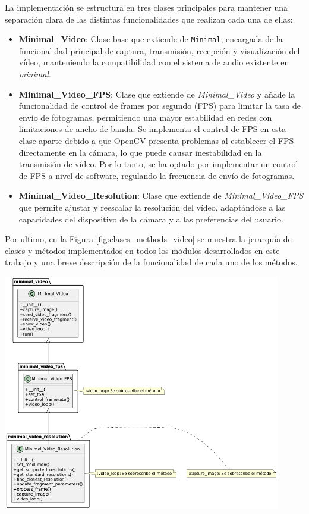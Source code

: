 La implementación se estructura en tres clases principales para mantener una separación clara de las distintas funcionalidades que realizan cada una de ellas:

\begin{itemize}
    \item \textbf{Minimal\_Video}: Clase base que extiende de \texttt{Minimal}, encargada de la funcionalidad principal de captura, transmisión, recepción y visualización del vídeo, manteniendo la compatibilidad con el sistema de audio existente en \textit{minimal}.
    \item \textbf{Minimal\_Video\_FPS}: Clase que extiende de \textit{Minimal\_Video} y añade la funcionalidad de control de frames por segundo (FPS) para limitar la tasa de envío de fotogramas, permitiendo una mayor estabilidad en redes con limitaciones de ancho de banda. Se implementa el control de FPS en esta clase aparte debido a que OpenCV presenta problemas al establecer el FPS directamente en la cámara, lo que puede causar inestabilidad en la transmisión de vídeo. Por lo tanto, se ha optado por implementar un control de FPS a nivel de software, regulando la frecuencia de envío de fotogramas.
    \item \textbf{Minimal\_Video\_Resolution}: Clase que extiende de \textit{Minimal\_Video\_FPS} que permite ajustar y reescalar la resolución del vídeo, adaptándose a las capacidades del dispositivo de la cámara y a las preferencias del usuario.
\end{itemize}

Por ultimo, en la Figura \ref{fig:clases_methods_video} se muestra la jerarquía de clases y métodos implementados en todos los módulos desarrollados en este trabajo y una breve descripción de la funcionalidad de cada uno de los métodos.
\begin{center}
    \includegraphics[width = 0.91\textwidth]{images/uml.png}
    \label{fig:clases_methods_video}
\end{center}

